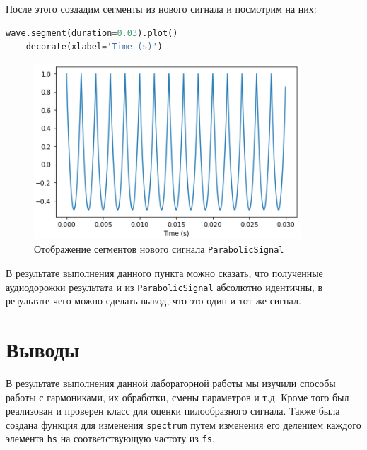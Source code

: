 \documentclass[a4paper]{article}
\begin{document}
            После этого создадим сегменты из нового сигнала и посмотрим на них:
            
\begin{lstlisting}[language=Python, caption= Отображение сегментов нового сигнала \texttt{ParabolicSignal}]
    wave.segment(duration=0.03).plot()
    decorate(xlabel='Time (s)')
\end{lstlisting}               
            
            \begin{figure}[H]
                \centering
                \includegraphics[width=\textwidth]{ex_6_parabolicSignal_segment.png}
                \caption{Отображение сегментов нового сигнала \texttt{ParabolicSignal}}
                \label{fig:ex_6_parabolicSignal_segment}
            \end{figure}
            
            В результате выполнения данного пункта можно сказать, что полученные аудиодорожки результата и из \texttt{ParabolicSignal} абсолютно идентичны, в результате чего можно сделать вывод, что это один и тот же сигнал.
            
    \newpage
        \section{Выводы}
            В результате выполнения данной лабораторной работы мы изучили способы работы с гармониками, их обработки, смены параметров и т.д. Кроме того был реализован и проверен класс для оценки пилообразного сигнала. Также была создана функция для изменения \texttt{spectrum} путем изменения его делением каждого элемента \texttt{hs} на соответствующую частоту из \texttt{fs}. 
\end{document}
